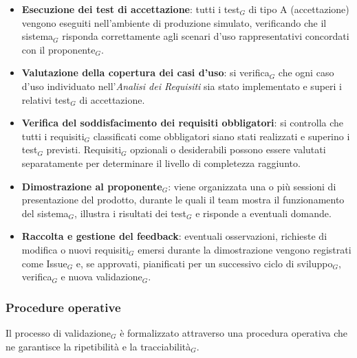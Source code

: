\documentclass[a4paper, 10pt]{article}
\begin{document}
\begin{itemize}
    \item \textbf{Esecuzione dei test di accettazione}: tutti i test$_G$ di tipo A (accettazione) vengono eseguiti nell'ambiente di produzione simulato, verificando che il sistema$_G$ risponda correttamente agli scenari d'uso rappresentativi concordati con il proponente$_G$.
    \item \textbf{Valutazione della copertura dei casi d'uso}: si verifica$_G$ che ogni caso d'uso individuato nell'\emph{Analisi dei Requisiti} sia stato implementato e superi i relativi test$_G$ di accettazione.
    \item \textbf{Verifica del soddisfacimento dei requisiti obbligatori}: si controlla che tutti i requisiti$_G$ classificati come obbligatori siano stati realizzati e superino i test$_G$ previsti. Requisiti$_G$ opzionali o desiderabili possono essere valutati separatamente per determinare il livello di completezza raggiunto.
    \item \textbf{Dimostrazione al proponente$_G$}: viene organizzata una o più sessioni di presentazione del prodotto, durante le quali il team mostra il funzionamento del sistema$_G$, illustra i risultati dei test$_G$ e risponde a eventuali domande.
    \item \textbf{Raccolta e gestione del feedback}: eventuali osservazioni, richieste di modifica o nuovi requisiti$_G$ emersi durante la dimostrazione vengono registrati come Issue$_G$ e, se approvati, pianificati per un successivo ciclo di sviluppo$_G$, verifica$_G$ e nuova validazione$_G$.
\end{itemize}

\subsubsection{Procedure operative}
\label{subsec:procedure_validazione}

Il processo di validazione$_G$ è formalizzato attraverso una procedura operativa che ne garantisce la ripetibilità e la tracciabilità$_G$.
\end{document}
